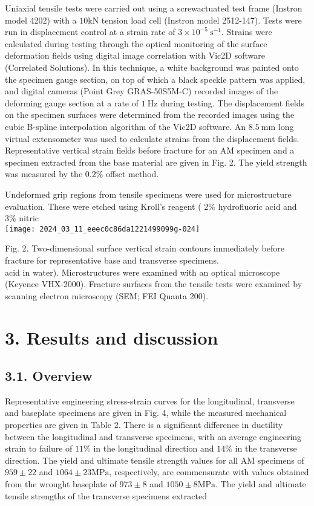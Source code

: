 \documentclass[10pt]{article}
\begin{document}
Uniaxial tensile tests were carried out using a screwactuated test frame (Instron model 4202) with a $10 \mathrm{kN}$ tension load cell (Instron model 2512-147). Tests were run in displacement control at a strain rate of $3 \times 10^{-5} \mathrm{~s}^{-1}$. Strains were calculated during testing through the optical monitoring of the surface deformation fields using digital image correlation with Vic2D software (Correlated Solutions). In this technique, a white background was painted onto the specimen gauge section, on top of which a black speckle pattern was applied, and digital cameras (Point Grey GRAS-50S5M-C) recorded images of the deforming gauge section at a rate of $1 \mathrm{~Hz}$ during testing. The displacement fields on the specimen surfaces were determined from the recorded images using the cubic B-spline interpolation algorithm of the Vic2D software. An $8.5 \mathrm{~mm}$ long virtual extensometer was used to calculate strains from the displacement fields. Representative vertical strain fields before fracture for an AM specimen and a specimen extracted from the base material are given in Fig. 2. The yield strength was measured by the $0.2 \%$ offset method.

Undeformed grip regions from tensile specimens were used for microstructure evaluation. These were etched using Kroll's reagent ( $2 \%$ hydrofluoric acid and 3\% nitric\\
\texttt{[image: 2024\_03\_11\_eeec0c86da1221499099g-024]}

Fig. 2. Two-dimensional surface vertical strain contours immediately before fracture for representative base and transverse specimens.\\
acid in water). Microstructures were examined with an optical microscope (Keyence VHX-2000). Fracture surfaces from the tensile tests were examined by scanning electron microscopy (SEM; FEI Quanta 200).

\section*{3. Results and discussion}
\subsection*{3.1. Overview}
Representative engineering stress-strain curves for the longitudinal, transverse and baseplate specimens are given in Fig. 4, while the measured mechanical properties are given in Table 2. There is a significant difference in ductility between the longitudinal and transverse specimens, with an average engineering strain to failure of $11 \%$ in the longitudinal direction and $14 \%$ in the transverse direction. The yield and ultimate tensile strength values for all AM specimens of $959 \pm 22$ and $1064 \pm 23 \mathrm{MPa}$, respectively, are commensurate with values obtained from the wrought baseplate of $973 \pm 8$ and $1050 \pm 8 \mathrm{MPa}$. The yield and ultimate tensile strengths of the transverse specimens extracted
\end{document}
